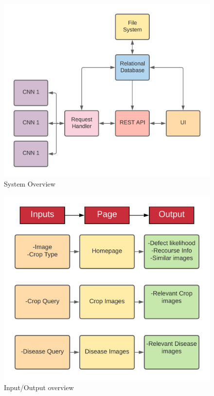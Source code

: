   \begin{figure}[H]
    \begin{center}
      \includegraphics[scale=0.7]{Images/System_Overview_v1}
      \caption{System Overview}
      \label{fig:sys_overview}
    \end{center}
  \end{figure}
    \begin{figure}[H]
      \begin{center}
        \includegraphics[scale=0.7]{Images/Input_Output_UI}
        \caption{Input/Output overview}
        \label{fig:input_output}
      \end{center}
    \end{figure}
